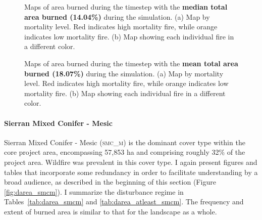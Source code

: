 \begin{figure}[!htbp]
  \centering
  \caption{Maps of area burned during the timestep with the \textbf{median total area burned (14.04\%)} during the simulation. (a) Map by mortality level. Red indicates high mortality fire, while orange indicates low mortality fire. (b) Map showing each individual fire in a different color.}
  \label{fig:darea_median_map}
\end{figure}

\begin{figure}[!htbp]
  \centering
  \caption{Maps of area burned during the timestep with the \textbf{mean total area burned (18.07\%)} during the simulation. (a) Map by mortality level. Red indicates high mortality fire, while orange indicates low mortality fire. (b) Map showing each individual fire in a different color.}
  \label{fig:darea_mean_map}
\end{figure}

\clearpage


\paragraph{Sierran Mixed Conifer - Mesic}
Sierran Mixed Conifer - Mesic (\textsc{smc\_m}) is the dominant cover type within the core project area, encompassing 57,853 ha and comprising roughly 32\% of the project area. Wildfire was prevalent in this cover type. I again present figures and tables that incorporate some redundancy in order to facilitate understanding by a broad audience, as described in the beginning of this section (Figure \ref{fig:darea_smcm}). I summarize the disturbance regime in Tables~\ref{tab:darea_smcm} and \ref{tab:darea_atleast_smcm}. The frequency and extent of burned area is similar to that for the landscape as a whole.

